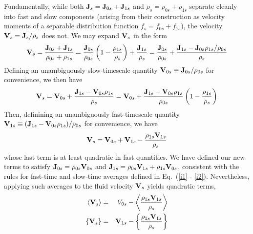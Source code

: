 Fundamentally, while both ${\bf J}_{s} = {\bf J}_{0s} + {\bf J}_{1s}$ and $\rho_{s} = \rho_{0s}
+ \rho_{1s}$ separate cleanly into fast and slow components (arising from their construction
as velocity moments of a separable distribution function $f_{s} = f_{0s} + f_{1s}$), the velocity
${\bf V}_{s} = {\bf J}_{s}/\rho_{s}$ does not.  We may expand ${\bf V}_{s}$ in the form
\begin{equation}
{\bf V}_{s} = {{\bf J}_{0s} + {\bf J}_{1s} \over \rho_{0s} + \rho_{1s}} =
{{\bf J}_{0s} \over \rho_{0s}} \left( 1 - {\rho_{1s} \over \rho_{s}} \right) +
{{\bf J}_{1s} \over \rho_{s}} =
{{\bf J}_{0s} \over \rho_{0s}} + {{\bf J}_{1s} - {\bf J}_{0s} \rho_{1s}/\rho_{0s} \over \rho_{s}} 
\end{equation}
Defining an unambiguously slow-timescale quantity ${\bf V}_{0s} \equiv {\bf J}_{0s}/\rho_{0s}$
for convenience, we then have
\begin{equation}
{\bf V}_{s} = {\bf V}_{0s} + {{\bf J}_{1s} - {\bf V}_{0s} \rho_{1s} \over \rho_{s}} 
= {\bf V}_{0s} + {{\bf J}_{1s} - {\bf V}_{0s} \rho_{1s} \over \rho_{0s}}
\left(1 - {\rho_{1s} \over \rho_{s}} \right)
\end{equation} 
Then, definining an unambiguously fast-timescale quantity ${\bf V}_{1s} \equiv
({\bf J}_{1s} - {\bf V}_{0s} \rho_{1s})/\rho_{0s}$ for convenience, we have
\begin{equation}
{\bf V}_{s} = {\bf V}_{0s} + {\bf V}_{1s} - {\rho_{1s} {\bf V}_{1s} \over \rho_{s}}
\end{equation} 
whose last term is at least quadratic in fast quantities.  We have defined our new terms
to satisfy ${\bf J}_{0s} = \rho_{0s} {\bf V}_{0s}$ and ${\bf J}_{1s} = \rho_{0s} {\bf V}_{1s}
+ \rho_{1s} {\bf V}_{0s}$, consistent with the rules for fast-time and slow-time averages
defined in Eq.~(\ref{i1} - \ref{i2}).  Nevertheless, applying such averages
to the fluid velocity ${\bf V}_{s}$ yields quadratic terms,
\begin{eqnarray}
\langle {\bf V}_{s} \rangle & = & V_{0s} - \left\langle {\rho_{1s} {\bf V}_{1s} \over \rho_{s}} \right\rangle \\
\{ {\bf V}_{s} \} & = & {\bf V}_{1s} - \left\{ {\rho_{1s} {\bf V}_{1s} \over \rho_{s}} \right\}
\end{eqnarray}


